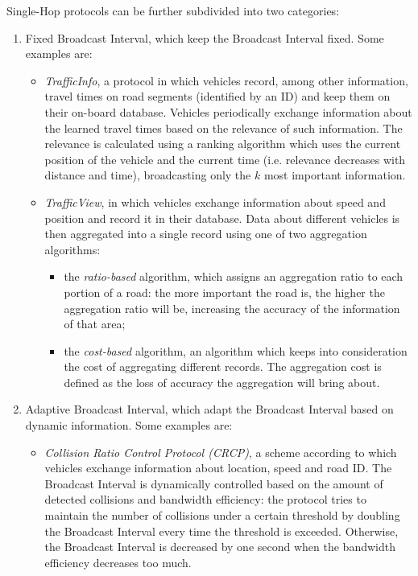 		Single-Hop protocols can be further subdivided into two categories:
		\begin{enumerate}
			
			\item Fixed Broadcast Interval, which keep the Broadcast Interval fixed. Some examples are:
			\begin{itemize}
				\renewcommand\labelitemi{--}
				
				\item \textit{TrafficInfo}\cite{4621303}, a protocol in which vehicles record, among other information, travel times on road segments (identified by an ID) and keep them on their on-board database. Vehicles periodically exchange information about the learned travel times based on the relevance of such information. The relevance is calculated using a ranking algorithm which uses the current position of the vehicle and the current time (i.e. relevance decreases with distance and time), broadcasting only the $k$  most important information. 
				
				\item \textit{TrafficView}\cite{1263039}, in which vehicles exchange information about speed and position and record it in their database. Data about different vehicles is then aggregated into a single record using one of two aggregation algorithms:
				\begin{itemize}
					\item the \textit{ratio-based} algorithm, which assigns an aggregation ratio to each portion of a road: the more important the road is, the higher the aggregation ratio will be, increasing the accuracy of the information of that area;
					\item the \textit{cost-based} algorithm, an algorithm which keeps into consideration the cost of aggregating different records. The aggregation cost is defined as the loss of accuracy the aggregation will bring about.
				\end{itemize} 
			\end{itemize}
			\item Adaptive Broadcast Interval, which adapt the Broadcast Interval based on dynamic information. Some examples are:
			\begin{itemize}
				\renewcommand\labelitemi{--}
				
				\item \textit{Collision Ratio Control Protocol (CRCP)}\cite{4357748}, a scheme according to which vehicles exchange information about location, speed and road ID. The Broadcast Interval is dynamically controlled based on the amount of detected collisions and bandwidth efficiency: the protocol tries to maintain the number of collisions under a certain threshold by doubling the Broadcast Interval every time the threshold is exceeded. Otherwise, the Broadcast Interval is decreased by one second when the bandwidth efficiency decreases too much.
				

\end{itemize}
\end{enumerate}
